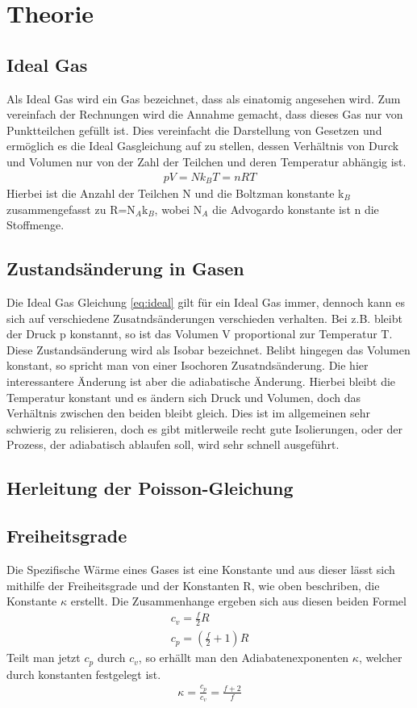 \documentclass[12pt,a4paper,titlepage,headinclude,bibtotoc]{scrartcl}
\begin{document}
\section{Theorie}
\label{sec:theorie}

\subsection{Ideal Gas}
Als Ideal Gas wird ein Gas bezeichnet, dass als einatomig angesehen wird.
Zum vereinfach der Rechnungen wird die Annahme gemacht, dass dieses Gas nur von Punktteilchen gefüllt ist.
Dies vereinfacht die Darstellung von Gesetzen und ermöglich es die Ideal Gasgleichung auf zu stellen, dessen Verhältnis von Durck und Volumen nur von der Zahl der Teilchen und deren Temperatur abhängig ist.
\begin{align}
	pV=Nk_BT=nRT\label{eq:ideal}
\end{align}
Hierbei ist die Anzahl der Teilchen N und die Boltzman konstante k$_B$ zusammengefasst zu R=N$_A$k$_B$, wobei N$_A$ die Advogardo konstante ist n die Stoffmenge.

\subsection{Zustandsänderung in Gasen}
Die Ideal Gas Gleichung \eqref{eq:ideal} gilt für ein Ideal Gas immer, dennoch kann es sich auf verschiedene Zusatndsänderungen verschieden verhalten.
Bei z.B. bleibt der Druck p konstannt, so ist das Volumen V proportional zur Temperatur T.
Diese Zustandsänderung wird als Isobar bezeichnet.
Belibt hingegen das Volumen konstant, so spricht man von einer Isochoren Zusatndsänderung.
Die hier interessantere Änderung ist aber die adiabatische Änderung.
Hierbei bleibt die Temperatur konstant und es ändern sich Druck und Volumen, doch das Verhältnis zwischen den beiden bleibt gleich.
Dies ist im allgemeinen sehr schwierig zu relisieren, doch es gibt mitlerweile recht gute Isolierungen, oder der Prozess, der adiabatisch ablaufen soll, wird sehr schnell ausgeführt.

\subsection{Herleitung der Poisson-Gleichung}


\subsection{Freiheitsgrade}
Die Spezifische Wärme eines Gases ist eine Konstante und aus dieser lässt sich mithilfe der Freiheitsgrade und der Konstanten R, wie oben beschriben, die Konstante $\kappa$ erstellt.
Die Zusammenhange ergeben sich aus diesen beiden Formel %
\begin{align}
	c_v=\frac{f}{2}R\\
	c_p=\left(\frac{f}{2}+1\right)R
\end{align}
Teilt man jetzt $c_p$ durch $c_v$, so erhällt man den Adiabatenexponenten $\kappa$, welcher durch konstanten festgelegt ist.
\begin{align}
	\kappa=\frac{c_p}{c_v}=\frac{f+2}{f}
\end{align}
\end{document}
